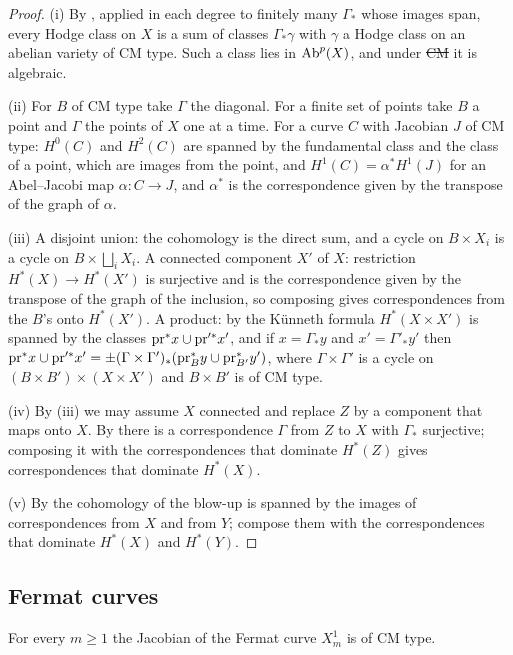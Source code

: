 \begin{proof}
(i) By , applied in each degree to finitely many
$\Gamma_{*}$ whose images span, every Hodge class on $X$ is a sum of classes
$\Gamma_{*}\gamma$ with $\gamma$ a Hodge class on an abelian variety of CM
type. Such a class lies in $\operatorname{Ab}^{p}(X)$, and under \st{CM} it is algebraic.

(ii) For $B$ of CM type take $\Gamma$ the diagonal. For a finite set of
points take $B$ a point and $\Gamma$ the points of $X$ one at a time. For a
curve $C$ with Jacobian $J$ of CM type: $H^{0}(C)$ and $H^{2}(C)$ are spanned
by the fundamental class and the class of a point, which are images from the
point, and $H^{1}(C)=\alpha^{*}H^{1}(J)$ for an Abel--Jacobi map
$\alpha\colon C\to J$, and $\alpha^{*}$ is the correspondence given by the
transpose of the graph of $\alpha$.

(iii) A disjoint union: the cohomology is the direct sum, and a cycle on
$B\times X_{i}$ is a cycle on $B\times\bigsqcup_{i}X_{i}$. A connected
component $X'$ of $X$: restriction $H^{*}(X)\to H^{*}(X')$ is surjective and
is the correspondence given by the transpose of the graph of the inclusion,
so composing gives correspondences from the $B$'s onto $H^{*}(X')$. A
product: by the K\"unneth formula $H^{*}(X\times X')$ is spanned by the
classes $\mathrm{pr}^{*}x\cup\mathrm{pr}'^{*}x'$, and if $x=\Gamma_{*}y$ and
$x'=\Gamma'_{*}y'$ then $\mathrm{pr}^{*}x\cup\mathrm{pr}'^{*}x'=\pm(\Gamma\times\Gamma')_{*}
(\mathrm{pr}_{B}^{*}y\cup\mathrm{pr}_{B'}^{*}y')$, where $\Gamma\times\Gamma'$ is a cycle on
$(B\times B')\times(X\times X')$ and $B\times B'$ is of CM type.

(iv) By (iii) we may assume $X$ connected and replace $Z$ by a component
that maps onto $X$. By  there is a correspondence $\Gamma$
from $Z$ to $X$ with $\Gamma_{*}$ surjective; composing it with the
correspondences that dominate $H^{*}(Z)$ gives correspondences that dominate
$H^{*}(X)$.

(v) By  the cohomology of the blow-up is spanned by the
images of correspondences from $X$ and from $Y$; compose them with the
correspondences that dominate $H^{*}(X)$ and $H^{*}(Y)$.
\end{proof}

\subsection{Fermat curves}

\begin{lemma}\label{lem:fermatcurve}
For every $m\ge1$ the Jacobian of the Fermat curve $X^{1}_{m}$ is of CM type.
\end{lemma}

